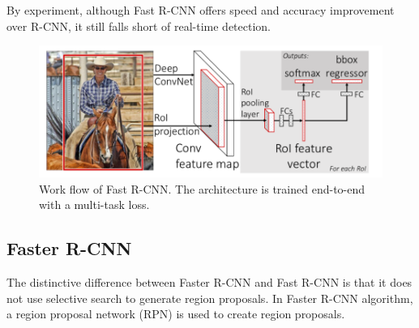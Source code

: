 \documentclass[letterpaper]{article} %
\begin{document}
\noindent By experiment, although Fast R-CNN offers speed and accuracy improvement over R-CNN, it still falls short of real-time detection.
\begin{figure}[ht]
\hspace{0mm}
\centering
\includegraphics[scale=0.25]{Figure/fast_r_cnn.png}
\caption{\footnotesize{Work flow of Fast R-CNN. The architecture is trained end-to-end with a multi-task loss.}}
\label{fig:fast_2}
\vspace{0mm}
\end{figure}


\subsection{Faster R-CNN}
The distinctive difference between Faster R-CNN and Fast R-CNN is that it does not use selective search to generate region proposals. In Faster R-CNN algorithm, a region proposal network (RPN) is used to create region proposals. \cite{fasterRcnn}\\
\end{document}
